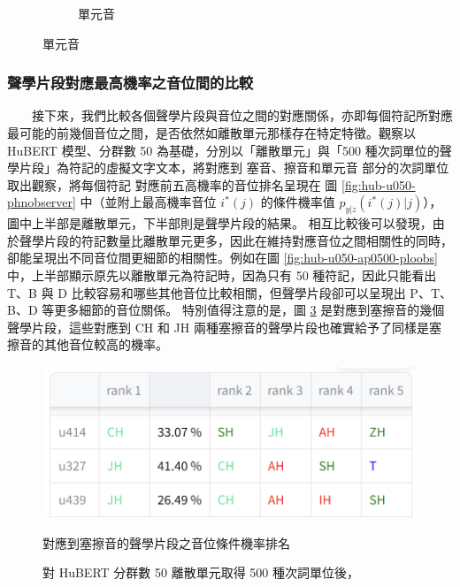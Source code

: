 {\begin{figure}
\begin{subfigure}{\textwidth}
                 \caption{單元音}
                 \label{fig:hub-u050-ap0500-vowobs}
             \end{subfigure}

                         \label{fig:hub-u050-phnobserver--3}
        \end{figure}
    }

\subsubsection{聲學片段對應最高機率之音位間的比較}

　　接下來，我們比較各個聲學片段與音位之間的對應關係，亦即每個符記所對應最可能的前幾個音位之間，是否依然如離散單元那樣存在特定特徵。觀察以 HuBERT 模型、分群數 50 為基礎，分別以「離散單元」與「500 種次詞單位的聲學片段」為符記的虛擬文字文本，將對應到
塞音、擦音和單元音
部分的次詞單位取出觀察，將每個符記
對應前五高機率的音位排名呈現在
圖 \ref{fig:hub-u050-phnobserver} 中（並附上最高機率音位 $i^*(j)$ 的條件機率值 $p_{y|z}(i^*(j)|j)$），圖中上半部是離散單元，下半部則是聲學片段的結果。
相互比較後可以發現，由於聲學片段的符記數量比離散單元更多，因此在維持對應音位之間相關性的同時，卻能呈現出不同音位間更細節的相關性。例如在圖 \ref{fig:hub-u050-ap0500-ploobs} 中，上半部顯示原先以離散單元為符記時，因為只有 50 種符記，因此只能看出 T、B 與 D 比較容易和哪些其他音位比較相關，但聲學片段卻可以呈現出 P、T、B、D 等更多細節的音位關係。
特別值得注意的是，圖 \ref{fig:aff} 是對應到塞擦音的幾個聲學片段，這些對應到 CH 和 JH 兩種塞擦音的聲學片段也確實給予了同樣是塞擦音的其他音位較高的機率。
    \begin{figure}
        \centering
        \includegraphics[width=0.8\linewidth]{figures/ch4figs/aff-hub50-500.png}
        \caption{對 HuBERT 分群數 50 離散單元取得 500 種次詞單位後，}
        對應到塞擦音的聲學片段之音位條件機率排名
        \label{fig:aff}
    \end{figure}


